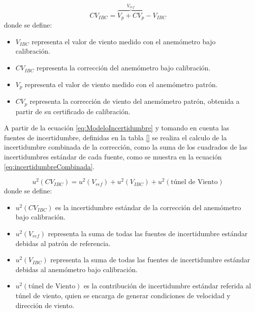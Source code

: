 \begin{equation}
    CV_{IBC} = \overbrace{V_{p} + CV_{p}}^{V_{ref}} - V_{IBC}
    \label{eq:ModeloIncertidumbre}
\end{equation}
donde se define:

\begin{itemize}
    \item $V_{IBC}$ representa el valor de viento medido con el anemómetro bajo calibración.
    \item $CV_{IBC}$ representa la corrección del anemómetro bajo calibración.
    \item $V_{p}$ representa el valor de viento medido con el anemómetro patrón.
    \item $CV_{p}$ representa la corrección de viento del anemómetro patrón, obtenida a partir de su certificado de calibración.
\end{itemize}

A partir de la ecuación \ref{eq:ModeloIncertidumbre} y tomando en cuenta las fuentes de incertidumbre, definidas en la tabla \ref{} se realiza el calculo de la incertidumbre combinada de la corrección, como la suma de los cuadrados de las incertidumbres estándar de cada fuente, como se muestra en la ecuación \ref{eq:incertidumbreCombinada}.

\begin{equation}
    u^{2}(CV_{IBC}) = u^{2}(V_{ref})+u^{2}(V_{IBC})+u^{2}(\text{túnel de Viento})
    \label{eq:incertidumbreCombinada}
\end{equation}
donde se define:

\begin{itemize}
    \item $u^{2}(CV_{IBC})$ es la incertidumbre estándar de la corrección del anemómetro bajo calibración.
    \item $u^{2}(V_{ref})$ representa la suma de todas las fuentes de incertidumbre estándar debidas al patrón de referencia.
    \item $u^{2}(V_{IBC})$ representa la suma de todas las fuentes de incertidumbre estándar debidas al anemómetro bajo calibración.
    \item $u^{2}(\text{túnel de Viento})$ es la contribución de incertidumbre estándar referida al túnel de viento, quien se encarga de generar condiciones de velocidad y dirección de viento.
\end{itemize}


